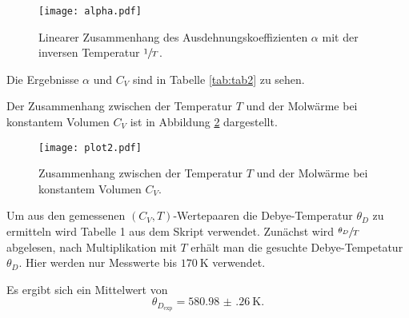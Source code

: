 \begin{figure}[H]
  \centering
  \texttt{[image: alpha.pdf]}
  \caption{Linearer Zusammenhang des Ausdehnungskoeffizienten $\alpha$ mit der
  inversen Temperatur $\sfrac{1}{T}$.}
  \label{fig:alpha}
\end{figure}

Die Ergebnisse $\alpha$ und $C_V$ sind in Tabelle \ref{tab:tab2} zu sehen.


Der Zusammenhang zwischen der Temperatur $T$ und der Molwärme bei konstantem Volumen
$C_V$ ist in Abbildung \ref{fig:Cv} dargestellt.

\begin{figure}[H]
  \centering
  \texttt{[image: plot2.pdf]}
  \caption{Zusammenhang zwischen der Temperatur $T$ und der Molwärme bei konstantem Volumen
  $C_V$.}
  \label{fig:Cv}
\end{figure}

Um aus den gemessenen $(C_V, T)$-Wertepaaren die Debye-Temperatur $\theta_D$ zu ermitteln
wird Tabelle 1 aus dem Skript \cite{skript} verwendet. Zunächst wird $\sfrac{\theta_D}{T}$\;
abgelesen, nach Multiplikation mit $T$ erhält man die gesuchte Debye-Tempetatur $\theta_D$.
Hier werden nur Messwerte bis $\SI{170}{\K}$ verwendet.

Es ergibt sich ein Mittelwert von
\begin{equation}
  \theta_{D_\text{exp}}=\SI{580.98(26)}{\K}.
\end{equation}

